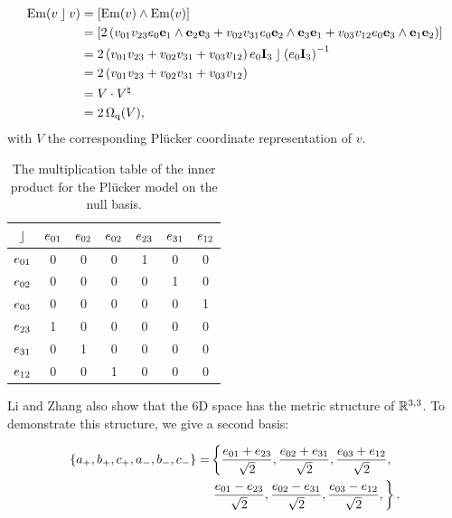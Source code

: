 \begin{align*}
  \operatorname{Em}(v \mathbin{\rfloor} v) &= \left[\operatorname{Em}(v) \wedge \operatorname{Em}(v)\right] \\
    &= \left[ 2 \left( v_{01} v_{23} e_0\mathbf{e}_1 \wedge \mathbf{e}_2\mathbf{e}_3 + v_{02} v_{31} e_0\mathbf{e}_2 \wedge \mathbf{e}_3\mathbf{e}_1 + v_{03} v_{12} e_0\mathbf{e}_3 \wedge \mathbf{e}_1\mathbf{e}_2 \right) \right] \\
    &= 2 \left( v_{01} v_{23} + v_{02} v_{31} + v_{03} v_{12} \right) e_0\mathbf{I}_3 \mathbin{\rfloor} \left(e_0\mathbf{I}_3\right)^{-1} \\
    &= 2 \left( v_{01} v_{23} + v_{02} v_{31} + v_{03} v_{12} \right) \\
    &= V \mathbin{\cdot} V^\natural \\
    &= 2 \operatorname{\Omega_q}(V),
\end{align*}
with $V$ the corresponding Pl\"ucker coordinate representation of $v$.

\begin{table}
  \caption{The multiplication table of the inner product for the Pl\"ucker model on the null basis.}
  \label{tab:nullmetric}
  \begin{center}
    \begin{tabular}{|c||c|c|c|c|c|c|}
      \hline
      $\mathbin{\rfloor}$ & $e_{01}$ & $e_{02}$ & $e_{02}$ & $e_{23}$ & $e_{31}$ & $e_{12}$ \\
      \hline \hline
      $e_{01}$ & 0 & 0 & 0 & 1 & 0 & 0 \\
      \hline
      $e_{02}$ & 0 & 0 & 0 & 0 & 1 & 0 \\
      \hline
      $e_{03}$ & 0 & 0 & 0 & 0 & 0 & 1 \\
      \hline
      $e_{23}$ & 1 & 0 & 0 & 0 & 0 & 0 \\
      \hline
      $e_{31}$ & 0 & 1 & 0 & 0 & 0 & 0 \\
      \hline
      $e_{12}$ & 0 & 0 & 1 & 0 & 0 & 0 \\
      \hline
    \end{tabular}
  \end{center}
\end{table}

Li and Zhang also show that the 6D space has the metric structure of $\mathbb{R}^{3,3}$.  To demonstrate this structure, we give a second basis:

\begin{equation*}
  \begin{split}
  \left\{a_{+}, b_{+}, c_{+}, a_{-}, b_{-}, c_{-}\right\} =
    & \left\{ \frac{e_{01} + e_{23}}{\sqrt{2}}, \frac{e_{02} + e_{31}}{\sqrt{2}}, \frac{e_{03} + e_{12}}{\sqrt{2}}, \right.\\
    & \left.  \frac{e_{01} - e_{23}}{\sqrt{2}}, \frac{e_{02} - e_{31}}{\sqrt{2}}, \frac{e_{03} - e_{12}}{\sqrt{2}}, \right\}
.
\end{split}
\end{equation*}

